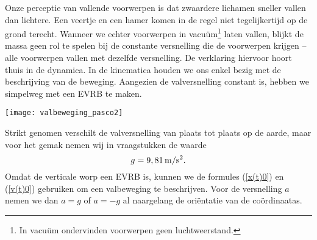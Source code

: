 \documentclass{ximera}
\begin{document}
	\author{Bart Lambregs}
    \xmsource



	Onze perceptie van vallende voorwerpen is dat zwaardere lichamen sneller vallen dan lichtere. Een veertje en een hamer komen in de regel niet tegelij\-ker\-tijd op de grond terecht. Wanneer we echter voorwerpen in vacu\"um\footnote{In vacu\"um ondervinden voorwerpen geen luchtweerstand.} laten vallen, blijkt de massa geen rol te spelen bij de constante versnelling die de voorwerpen krijgen -- alle voorwerpen vallen met dezelfde versnelling. De verklaring hiervoor hoort thuis in de dynamica. In de kinematica houden we ons enkel bezig met de beschrijving van de beweging. Aangezien de valversnelling constant is, hebben we simpelweg met een EVRB te maken.
	\begin{image}
	
	\texttt{[image: valbeweging\_pasco2]}
	\end{image}
	Strikt genomen verschilt de valversnelling van plaats tot plaats op de aarde, maar voor het gemak nemen wij in vraagstukken de waarde
	\[g=9,81\rm\,m/s^2.\]
	Omdat de verticale worp een EVRB is, kunnen we de formules (\ref{x(t)0}) en (\ref{v(t)0}) gebruiken om een valbeweging te beschrijven. Voor de versnelling $a$ nemen we dan $a=g$ of $a=-g$ al naargelang de ori\"entatie van de co\"ordinaatas.
	
	\clearpage
	
\end{document}
